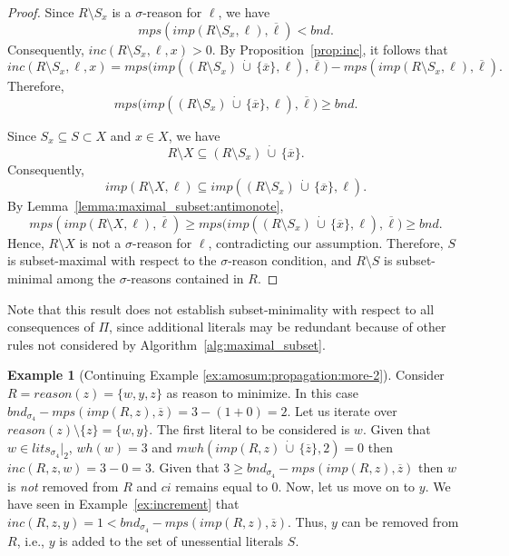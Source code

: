 \documentclass[preprint,authoryear]{elsarticle}
\newcommand{\lits}{\mathit{lits}}
\newcommand{\mwh}{\mathit{mwh}}
\newcommand{\wh}{\mathit{wh}}
\newcommand{\inc}{\mathit{inc}}
\newcommand{\mps}{\mathit{mps}}
\newcommand{\bnd}{\mathit{bnd}}
\newcommand{\cupdot}{\,\dot{\cup}\,}
\theoremstyle{definition}
\newtheorem{example}{Example}[section]
\begin{document}
{\begin{proof}
Since \(R\setminus S_x\) is a $\sigma$-reason for \(\ell\), we have
\[
\mps(\mathit{imp}(R\setminus S_x,\ell),\overline{\ell})<\bnd.
\]
Consequently, \(\inc(R\setminus S_x,\ell,x)>0\). By Proposition~\ref{prop:inc}, it follows that
\[
\inc(R\setminus S_x,\ell,x)
=
\mps\bigl(\mathit{imp}((R\setminus S_x)\cupdot\{\overline{x}\},\ell),
          \overline{\ell}\bigr)
-\mps(\mathit{imp}(R\setminus S_x,\ell),\overline{\ell}).
\]
Therefore,
\[
\mps\bigl(\mathit{imp}((R\setminus S_x)\cupdot\{\overline{x}\},\ell),
          \overline{\ell}\bigr)
\geq\bnd.
\]

Since \(S_x\subseteq S\subset X\) and \(x\in X\), we have
\[
R\setminus X
\subseteq
(R\setminus S_x)\cupdot\{\overline{x}\}.
\]
Consequently,
\[
\mathit{imp}(R\setminus X,\ell)
\subseteq
\mathit{imp}((R\setminus S_x)\cupdot\{\overline{x}\},\ell).
\]
By Lemma~\ref{lemma:maximal_subset:antimonote},
\[
\mps(\mathit{imp}(R\setminus X,\ell),\overline{\ell})
\geq
\mps\bigl(\mathit{imp}((R\setminus S_x)\cupdot\{\overline{x}\},\ell),
          \overline{\ell}\bigr)
\geq\bnd.
\]
Hence, \(R\setminus X\) is not a $\sigma$-reason for \(\ell\), contradicting our assumption. Therefore, \(S\) is subset-maximal with respect to the $\sigma$-reason condition, and \(R\setminus S\) is subset-minimal among the $\sigma$-reasons contained in $R$.
\end{proof}

Note that this result does not establish subset-minimality with respect to all consequences of $\Pi$, since additional literals may be redundant because of other rules not considered by Algorithm~\ref{alg:maximal_subset}.
}

\begin{example}[Continuing Example \ref{ex:amosum:propagation:more-2}]
    Consider $R = \mathit{reason}(z) = \{w, y, z\}$ as reason to minimize. In this case $\bnd_{\sigma_4} - \mps(\mathit{imp}(R, z), \overline{z})= 3 - (1 + 0) = 2$. Let us iterate over $\mathit{reason}(z) \setminus \{z\} = \{w, y\}$.
    The first literal to be considered is $w$. Given that $w \in \lits_{\sigma_4}|_2$, $\wh(w)=3$ and $\mwh(\mathit{imp}(R, z) \cupdot \{\overline{z}\}, 2) = 0$ then $\inc(R,z,w) = 3 - 0 = 3$. Given that $3 \ge \bnd_{\sigma_4} - \mps(\mathit{imp}(R, z), \overline{z})$ then $w$ is \textit{not} removed from $R$ and $\mathit{ci}$ remains equal to $0$. Now, let us move on to $y$. We have seen in Example~\ref{ex:increment} that $\mathit{inc}(R,z,y) = 1 < \bnd_{\sigma_4} - \mps(\mathit{imp}(R, z), \overline{z})$. Thus, $y$ can be removed from $R$, i.e., $y$ is added to the set of unessential literals $S$.
\end{example}
\end{document}
